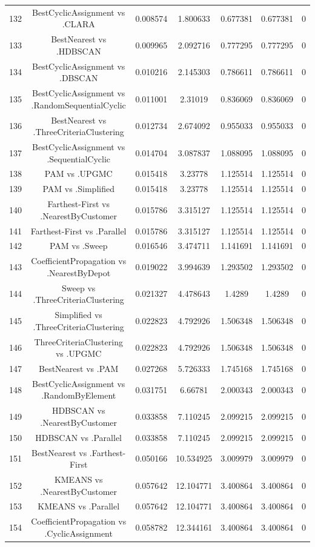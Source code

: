 \documentclass[a4paper,10pt]{article}
\begin{document}
\begin{landscape}
\begin{table}[!htp]
\begin{tabular}{ccccccc}
132&BestCyclicAssignment vs .CLARA&0.008574&1.800633&0.677381&0.677381&0\\
133&BestNearest vs .HDBSCAN&0.009965&2.092716&0.777295&0.777295&0\\
134&BestCyclicAssignment vs .DBSCAN&0.010216&2.145303&0.786611&0.786611&0\\
135&BestCyclicAssignment vs .RandomSequentialCyclic&0.011001&2.31019&0.836069&0.836069&0\\
136&BestNearest vs .ThreeCriteriaClustering&0.012734&2.674092&0.955033&0.955033&0\\
137&BestCyclicAssignment vs .SequentialCyclic&0.014704&3.087837&1.088095&1.088095&0\\
138&PAM vs .UPGMC&0.015418&3.23778&1.125514&1.125514&0\\
139&PAM vs .Simplified&0.015418&3.23778&1.125514&1.125514&0\\
140&Farthest-First vs .NearestByCustomer&0.015786&3.315127&1.125514&1.125514&0\\
141&Farthest-First vs .Parallel&0.015786&3.315127&1.125514&1.125514&0\\
142&PAM vs .Sweep&0.016546&3.474711&1.141691&1.141691&0\\
143&CoefficientPropagation vs .NearestByDepot&0.019022&3.994639&1.293502&1.293502&0\\
144&Sweep vs .ThreeCriteriaClustering&0.021327&4.478643&1.4289&1.4289&0\\
145&Simplified vs .ThreeCriteriaClustering&0.022823&4.792926&1.506348&1.506348&0\\
146&ThreeCriteriaClustering vs .UPGMC&0.022823&4.792926&1.506348&1.506348&0\\
147&BestNearest vs .PAM&0.027268&5.726333&1.745168&1.745168&0\\
148&BestCyclicAssignment vs .RandomByElement&0.031751&6.66781&2.000343&2.000343&0\\
149&HDBSCAN vs .NearestByCustomer&0.033858&7.110245&2.099215&2.099215&0\\
150&HDBSCAN vs .Parallel&0.033858&7.110245&2.099215&2.099215&0\\
151&BestNearest vs .Farthest-First&0.050166&10.534925&3.009979&3.009979&0\\
152&KMEANS vs .NearestByCustomer&0.057642&12.104771&3.400864&3.400864&0\\
153&KMEANS vs .Parallel&0.057642&12.104771&3.400864&3.400864&0\\
154&CoefficientPropagation vs .CyclicAssignment&0.058782&12.344161&3.400864&3.400864&0\\

\end{tabular}
\end{table}
\end{landscape}
\end{document}
